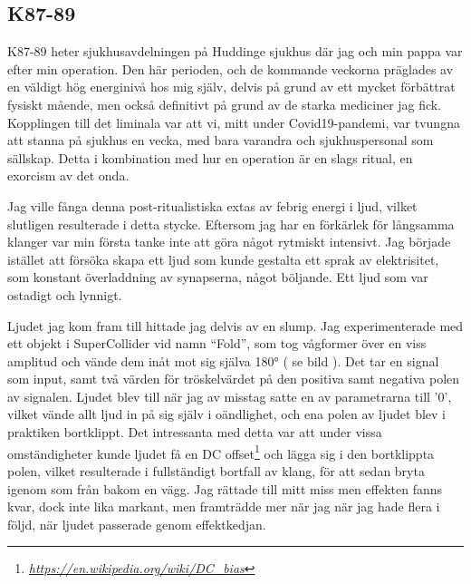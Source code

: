 \documentclass{article}
\begin{document}
\subsection{K87-89}
K87-89 heter sjukhusavdelningen på Huddinge sjukhus där jag och min pappa var efter min operation. Den här
perioden, och de kommande veckorna präglades av en väldigt hög energinivå hos mig själv, delvis på grund av
ett mycket förbättrat fysiskt mående, men också definitivt på grund av de starka mediciner jag fick.
Kopplingen till det liminala var att vi, mitt under Covid19-pandemi, var tvungna att stanna på sjukhus en
vecka, med bara varandra och sjukhuspersonal som sällskap. Detta i kombination med hur en operation är en
slags ritual, en exorcism av det onda. 

Jag ville fånga denna post-ritualistiska extas av febrig energi i ljud, vilket slutligen resulterade i detta
stycke. Eftersom jag har en förkärlek för långsamma klanger var min första tanke inte att göra något
rytmiskt intensivt. Jag började istället att försöka skapa ett ljud som kunde gestalta ett sprak av
elektrisitet, som konstant överladdning av synapserna, något böljande. Ett ljud som var ostadigt och
lynnigt. 

Ljudet jag kom fram till hittade jag delvis av en slump. Jag experimenterade med ett objekt i
SuperCollider vid namn ``Fold'', som tog vågformer över en viss amplitud och vände dem inåt mot sig själva
180° ( se bild ). Det tar en signal som input, samt två värden för tröskelvärdet på den positiva samt
negativa polen av signalen. Ljudet blev till när jag av misstag satte en av parametrarna till '0', vilket
vände allt ljud in på sig själv i oändlighet, och ena polen av ljudet blev i praktiken bortklippt. Det
intressanta med detta var att under vissa omständigheter kunde ljudet få en DC
offset\footnote{\emph{\url{https://en.wikipedia.org/wiki/DC\_bias}}}
och lägga sig i den bortklippta polen, vilket resulterade i fullständigt bortfall av klang, för att sedan
bryta igenom som från bakom en vägg. Jag rättade till mitt miss men effekten fanns kvar, dock inte lika
markant, men framträdde mer när jag när jag hade flera i följd, när ljudet passerade genom effektkedjan.
\end{document}
